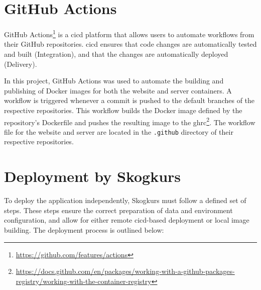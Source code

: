 \section{GitHub Actions}

GitHub Actions\footnote{\url{https://github.com/features/actions}} is a \acrfull{cicd} platform that allows users to automate workflows from their GitHub repositories. \acrshort{cicd} ensures that code changes are automatically tested and built (Integration), and that the changes are automatically deployed (Delivery).

In this project, GitHub Actions was used to automate the building and publishing of Docker images for both the website and server containers. A workflow is triggered whenever a commit is pushed to the default branches of the respective repositories. This workflow builds the Docker image defined by the repository's Dockerfile and pushes the resulting image to the \acrfull{ghrc}\footnote{\url{https://docs.github.com/en/packages/working-with-a-github-packages-registry/working-with-the-container-registry}}. The workflow file for the website and server are located in the \texttt{.github} directory of their respective repositories.

\section{Deployment by Skogkurs}

To deploy the application independently, Skogkurs must follow a defined set of steps. These steps ensure the correct preparation of data and environment configuration, and allow for either remote \acrshort{cicd}-based deployment or local image building. The deployment process is outlined below:

